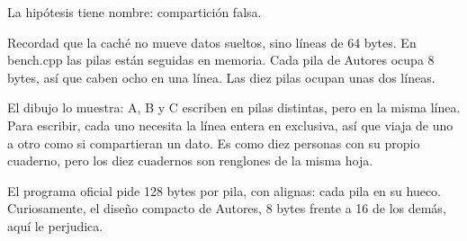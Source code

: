 La hipótesis tiene nombre: compartición falsa.

Recordad que la caché no mueve datos sueltos, sino líneas de 64 bytes. En bench.cpp las pilas están seguidas en memoria. Cada pila de Autores ocupa 8 bytes, así que caben ocho en una línea. Las diez pilas ocupan unas dos líneas.

El dibujo lo muestra: A, B y C escriben en pilas distintas, pero en la misma línea. Para escribir, cada uno necesita la línea entera en exclusiva, así que viaja de uno a otro como si compartieran un dato. Es como diez personas con su propio cuaderno, pero los diez cuadernos son renglones de la misma hoja.

El programa oficial pide 128 bytes por pila, con alignas: cada pila en su hueco. Curiosamente, el diseño compacto de Autores, 8 bytes frente a 16 de los demás, aquí le perjudica.
